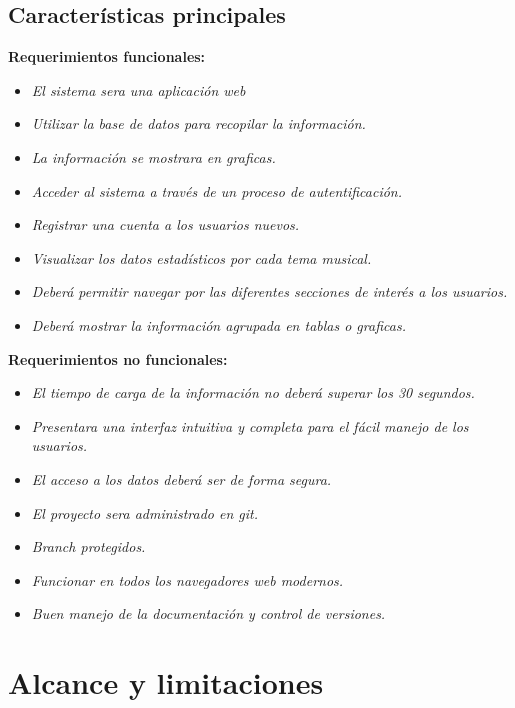 \documentclass[12pt,a4paper]{book}
\begin{document}
\section{Características principales}
\vspace{0.5 cm}
\textbf {Requerimientos funcionales:}
\vspace{0.5 cm}
\begin{itemize}
\item \textit{El sistema sera una aplicación web}
\item \textit{Utilizar la base de datos para recopilar la información.}
\item \textit{La información se mostrara en graficas.}
\item \textit{Acceder al sistema a través de un proceso de autentificación.}
\item \textit{Registrar una cuenta a los usuarios nuevos.}
\item \textit{Visualizar los datos estadísticos por cada tema musical.}
\item \textit{Deberá permitir navegar por las diferentes secciones de interés a los usuarios.}
\item \textit{Deberá mostrar la información agrupada en tablas o graficas.}
\end{itemize}
\newpage
\textbf {Requerimientos no funcionales:}
\vspace{0.5 cm}
\begin{itemize}
\item \textit{El tiempo de carga de la información no deberá superar los 30 segundos.}
\item \textit{Presentara una interfaz intuitiva y completa para el fácil manejo de los usuarios.}
\item \textit{El acceso a los datos deberá ser de forma segura.}
\item \textit{El proyecto sera administrado en git.}
\item \textit{Branch protegidos.}
\item \textit{Funcionar en todos los navegadores web modernos.}
\item \textit{Buen manejo de la documentación y control de versiones.}
\end{itemize}

\chapter{Alcance y limitaciones}
\end{document}

